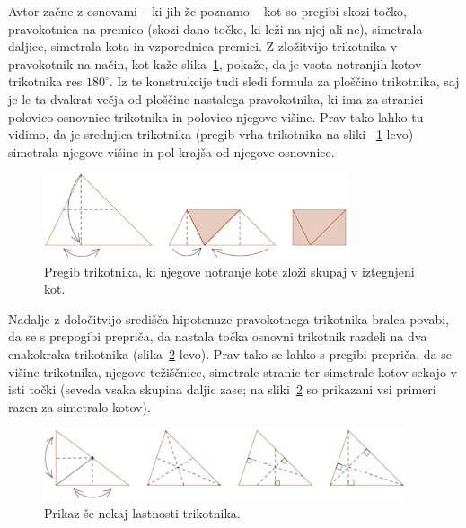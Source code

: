 Avtor začne z osnovami -- ki jih že poznamo -- kot so pregibi skozi točko, pravokotnica na premico (skozi dano točko, ki leži na njej ali ne), simetrala daljice, simetrala kota in vzporednica premici. Z zložitvijo trikotnika v pravokotnik na način, kot kaže slika~\ref{fig:trikotnik_vsota_kotov}, pokaže, da je vsota notranjih kotov trikotnika res $180^\circ$. Iz te konstrukcije tudi sledi formula za ploščino trikotnika, saj je le-ta dvakrat večja od ploščine nastalega pravokotnika, ki ima za stranici polovico osnovnice trikotnika in polovico njegove višine. Prav tako lahko tu vidimo, da je srednjica trikotnika (pregib vrha trikotnika na sliki ~\ref{fig:trikotnik_vsota_kotov} levo) simetrala njegove višine in pol krajša od njegove osnovnice.

\begin{figure}[h]
    \centering
    \includegraphics[width=0.8\textwidth]{images/osnovnosolski_prikazi/trikotnik_vsota_kotov.png}
    \caption[Vsota notranjih kotov trikotnika]{Pregib trikotnika, ki njegove notranje kote zloži skupaj v iztegnjeni kot.}
    \label{fig:trikotnik_vsota_kotov}
\end{figure}

Nadalje z določitvijo središča hipotenuze pravokotnega trikotnika bralca povabi, da se s prepogibi prepriča, da nastala točka osnovni trikotnik razdeli na dva enakokraka trikotnika (slika~\ref{fig:trikotnik_vec_lastnosti} levo). Prav tako se lahko s pregibi prepriča, da se višine trikotnika, njegove težiščnice, simetrale stranic ter simetrale kotov sekajo v isti točki (seveda vsaka skupina daljic zase; na sliki~\ref{fig:trikotnik_vec_lastnosti} so prikazani vsi primeri razen za simetralo kotov).

\begin{figure}[h]
    \centering
    \includegraphics[width=0.95\textwidth]{images/osnovnosolski_prikazi/vec_lastnosti1.png}
    \caption[Pregibi kot dokaz lastnosti trikotnika]{Prikaz še nekaj lastnosti trikotnika.}
    \label{fig:trikotnik_vec_lastnosti}
\end{figure}

